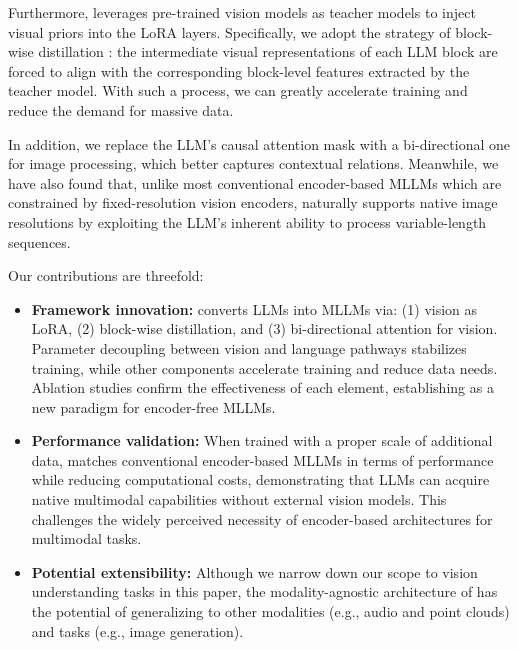 Furthermore, \model{} leverages pre-trained vision models as teacher models to inject visual priors into the LoRA layers. Specifically, we adopt the strategy of block-wise distillation \cite{distillation}: the intermediate visual representations of each LLM block are forced to align with the corresponding block-level features extracted by the teacher model. With such a process, we can greatly accelerate training and reduce the demand for massive data. 

In addition, we replace the LLM's causal attention mask with a bi-directional one for image processing, which better captures contextual relations. Meanwhile, we have also found that, unlike most conventional encoder-based MLLMs \cite{qwen, llava, llava1_5, llavaov, minigpt, minigptv2, cogvlm} which are constrained by fixed-resolution vision encoders, \model{} naturally supports native image resolutions by exploiting the LLM’s inherent ability to process variable-length sequences. 

Our contributions are threefold: 
\begin{itemize}
    \item \textbf{Framework innovation:} \model{} converts LLMs into MLLMs via: (1) vision as LoRA, (2) block-wise distillation, and (3) bi-directional attention for vision. Parameter decoupling between vision and language pathways stabilizes training, while other components accelerate training and reduce data needs. Ablation studies confirm the effectiveness of each element, establishing \model{} as a new paradigm for encoder-free MLLMs.

    \item \textbf{Performance validation:} When trained with a proper scale of additional data, \model{} matches conventional encoder-based MLLMs in terms of performance while reducing computational costs, demonstrating that LLMs can acquire native multimodal capabilities without external vision models. This challenges the widely perceived necessity of encoder-based architectures for multimodal tasks. 

    \item \textbf{Potential extensibility:} Although we narrow down our scope to vision understanding tasks in this paper, the modality-agnostic architecture of \model{} has the potential of generalizing to other modalities (e.g., audio and point clouds) and tasks (e.g., image generation).
\end{itemize}

